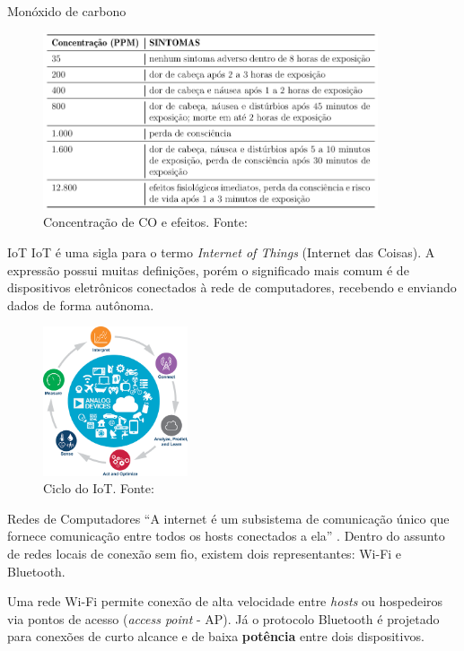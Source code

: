 \documentclass[12pt]{beamer}
\begin{document}
    \begin{frame}{Monóxido de carbono}
        \begin{figure}[ht]
            \centering
            \includegraphics[width=0.88\textwidth]{img/tab-concentracao-co.png}
            \caption{Concentração de CO e efeitos. Fonte: \cite{seguranca-contra-incendios}}\label{fig:co}
        \end{figure}
    \end{frame}

    \begin{frame}{IoT}
        IoT é uma sigla para o termo \textit{Internet of Things} (Internet das Coisas). 
        A expressão possui muitas definições, porém o significado mais comum é de dispositivos eletrônicos 
        conectados à rede de computadores, recebendo e enviando dados de forma autônoma.
        \begin{figure}[ht]
            \centering
            \includegraphics[width=0.38\textwidth]{img/iot-cycle.png}
            \caption{Ciclo do IoT. Fonte: \cite{iot-cycle}}\label{fig:cycleIoT}
        \end{figure}
    \end{frame}

    \begin{frame}{Redes de Computadores}
        ``A internet é um subsistema de comunicação único que fornece comunicação entre todos os hosts conectados a ela'' \cite[pp. 96]{sistemas-distribuidos-coulouris2013}. Dentro do 
        assunto de redes locais de conexão sem fio, existem dois representantes: Wi-Fi e Bluetooth. 
        
        Uma rede Wi-Fi permite conexão de alta velocidade entre \textit{hosts} ou hospedeiros via 
        pontos de acesso (\textit{access point} - AP). Já o protocolo Bluetooth é projetado para conexões de curto alcance e de baixa \textbf{potência} entre dois dispositivos.
    \end{frame}    
\end{document}
